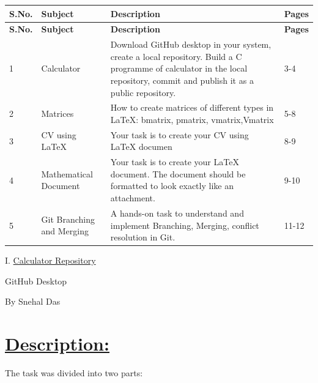 \documentclass{article}
\begin{document}
\begin{center}
    
\large \begin{longtable}{|p{}|p{}|p{}|p{}|}
    \hline
    \textbf{\Large S.No.} & \textbf{\Large Subject} & \textbf{\Large Description} & \textbf{\Large Pages} \\
    \hline
    \endfirsthead
    \hline
    \textbf{\Large S.No.} & \textbf{\Large Subject} & \textbf{\Large Description} & \textbf{\Large Pages} \\
    \hline
    \endhead
    \hline
    1 & Calculator & Download GitHub desktop in your system, create a local repository. Build a C programme of calculator in the local repository, commit and publish it as a public repository. & 3-4 \\
    \hline
    2 & Matrices & How to create matrices of different types in LaTeX: bmatrix, pmatrix, vmatrix,Vmatrix & 5-8 \\
    \hline
    3 & CV using LaTeX & Your task is to create your CV using LaTeX documen & 8-9 \\
    \hline
    4 & Mathematical Document & Your task is to create your LaTeX document. 
    The document should be formatted to look exactly like an attachment. & 9-10 \\
    \hline
    5 & Git Branching and Merging & A hands-on task to understand and implement Branching, Merging, conflict resolution in Git. & 11-12 \\
    \hline
    
    
\end{longtable}
\end{center}
\newpage

\begin{center}
    \Huge I. \underline{Calculator Repository}
    \end{center}
    \vspace{1em}

    \begin{center}
        \Large GitHub Desktop
    \end{center}

    \vspace{0.4em}
    
    \begin{center}
        \large By Snehal Das
    \end{center}


\section{\underline{Description:}}
The task was divided into two parts: \vspace{0.2cm}\newline
\end{document}

